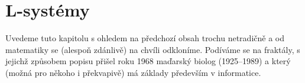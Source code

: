 \section{L-systémy}\label{sec:L-systemy}

Uvedeme tuto kapitolu s ohledem na předchozí obsah trochu netradičně a od matematiky se (alespoň zdánlivě) na chvíli odkloníme. Podíváme se na fraktály, s jejichž způsobem popisu přišel roku 1968 maďarský biolog  (1925--1989) a který (možná pro někoho i překvapivě) má základy především v informatice. \citep[str. 2]{Prusinkiewicz1990}